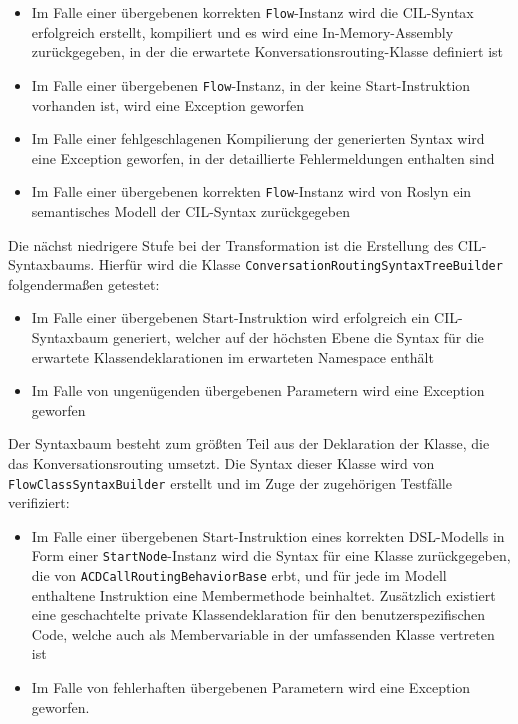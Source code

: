 \begin{itemize}
\item Im Falle einer übergebenen korrekten \texttt{Flow}-Instanz wird die CIL-Syntax erfolgreich erstellt, kompiliert und es wird eine In-Memory-Assembly zurückgegeben, in der die erwartete Konversationsrouting-Klasse definiert ist
\item Im Falle einer übergebenen \texttt{Flow}-Instanz, in der keine Start-Instruktion vorhanden ist, wird eine Exception geworfen
\item Im Falle einer fehlgeschlagenen Kompilierung der generierten Syntax wird eine Exception geworfen, in der detaillierte Fehlermeldungen enthalten sind
\item Im Falle einer übergebenen korrekten \texttt{Flow}-Instanz wird von Roslyn ein semantisches Modell der CIL-Syntax zurückgegeben
\end{itemize} 

Die nächst niedrigere Stufe bei der Transformation ist die Erstellung des CIL-Syntaxbaums. Hierfür wird die Klasse \texttt{ConversationRoutingSyntaxTreeBuilder} folgendermaßen getestet:

\begin{itemize}
\item Im Falle einer übergebenen Start-Instruktion wird erfolgreich ein CIL-Syn\-tax\-baum generiert, welcher auf der höchsten Ebene die Syntax für die erwartete Klassendeklarationen im erwarteten Namespace enthält
\item Im Falle von ungenügenden übergebenen Parametern wird eine Exception geworfen
\end{itemize}

Der Syntaxbaum besteht zum größten Teil aus der Deklaration der Klasse, die das Konversationsrouting umsetzt. Die Syntax dieser Klasse wird von \texttt{FlowClassSyntaxBuilder} erstellt und im Zuge der zugehörigen Testfälle verifiziert:

\begin{itemize}
\item Im Falle einer übergebenen Start-Instruktion eines korrekten DSL-Modells in Form einer \texttt{StartNode}-Instanz wird die Syntax für eine Klasse zurückgegeben, die von \texttt{ACDCallRoutingBehaviorBase} erbt, und für jede im Modell enthaltene Instruktion eine Membermethode beinhaltet. Zusätzlich existiert eine geschachtelte private Klassendeklaration für den benutzerspezifischen Code, welche auch als Membervariable in der umfassenden Klasse vertreten ist
\item Im Falle von fehlerhaften übergebenen Parametern wird eine Exception geworfen.
\end{itemize}

